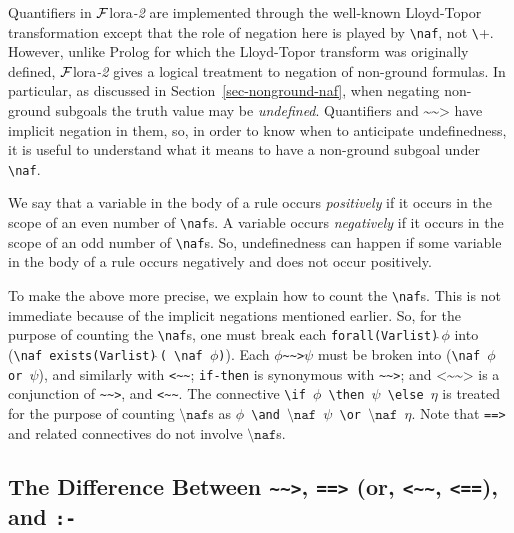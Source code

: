 \documentclass[11pt]{article}
\newcommand{\FLORA}{{\mbox{\sc ${\cal F}${lora}\rm\emph{-2}}}\xspace}
\newcommand{\FLSYSTEM}{\FLORA}
\newcommand{\rnafarr}{\texttt{\textasciitilde\textasciitilde>}}
\newcommand{\lnafarr}{\texttt{<\textasciitilde\textasciitilde}}
\newcommand{\rlnafarr}{\texttt{<\textasciitilde\textasciitilde>}}
\newcommand{\bs}{\textbackslash}
\newcommand{\PLGNAF}{\mbox{\texttt{\bs}+}\xspace}
\newcommand{\RULELOGNAF}{{\texttt{{\bs}naf}}\xspace}
\begin{document}
Quantifiers in \FLSYSTEM are implemented through the well-known Lloyd-Topor
transformation \cite{Lloy84} except that the role of negation here is
played by \texttt{\RULELOGNAF}, not \PLGNAF. However, unlike Prolog for which the
Lloyd-Topor transform was originally defined, \FLSYSTEM gives a
logical treatment to negation of non-ground formulas. In particular, as
discussed in Section~\ref{sec-nonground-naf}, when
negating non-ground subgoals the truth value may be \emph{undefined}.
Quantifiers and $\rnafarr$ have implicit negation in them, so, in order to
know when to anticipate undefinedness, it is useful
to understand what it means to have a non-ground subgoal under
\texttt{\RULELOGNAF}. 

We say that a variable in the body of a rule occurs \emph{positively} if it
occurs in the scope of an even number of  \texttt{\RULELOGNAF}s. A variable occurs
\emph{negatively} if it occurs in the scope of an odd number of
\texttt{\RULELOGNAF}s.  
So, undefinedness can happen if some variable in the body of a rule occurs
negatively and does not occur positively.

To make the above more precise, we explain how to count the \texttt{\RULELOGNAF}s. This is
not immediate because of the implicit negations mentioned earlier.
So, for the purpose of counting the \texttt{\RULELOGNAF}s, one must break
each \texttt{forall(Varlist)$\widehat{\ }\phi$}  into
(\texttt{\RULELOGNAF\,exists(Varlist)$\widehat{\ }$( \RULELOGNAF\,$\phi$)}). Each
$\phi$\rnafarr$\psi$ must be
broken into  (\texttt{\RULELOGNAF\,$\phi$ or $\psi$}), and similarly with
\lnafarr;
\texttt{if-then} is synonymous with \rnafarr; and   $\rlnafarr$
is a conjunction of \rnafarr, and \lnafarr. The connective
\texttt{\bs{}if\,$\phi$\,\bs{}then\,$\psi$\,\bs{}else\,$\eta$} is treated for the purpose of
counting $\RULELOGNAF$s as
\texttt{$\phi$\,\bs{}and\,$\RULELOGNAF$\,$\psi$\,\bs{}or\,$\RULELOGNAF$\,$\eta$}.  Note that \texttt{==>} and related
connectives do not involve $\RULELOGNAF$s.

\subsection{The Difference Between \rnafarr, \texttt{==>} (or,
  \lnafarr, \texttt{<==}), and \texttt{:-}}
\label{pg-strong-vs-weak-implication}
\end{document}
